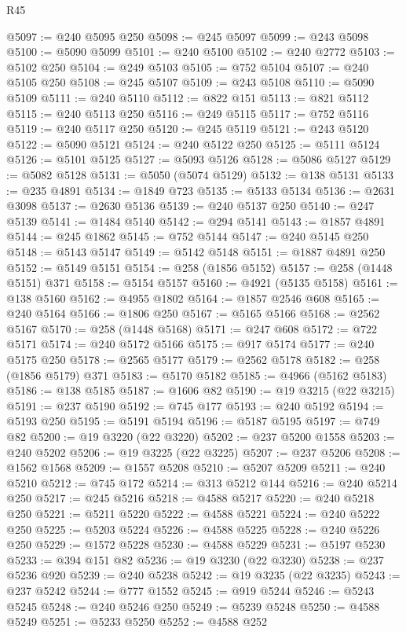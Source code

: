 \begin{lexlean}{R45}
\begin{coremodule}
{@5097 := @240 @5095 @250
@5098 := @245 @5097
@5099 := @243 @5098
@5100 := @5090 @5099
@5101 := @240 @5100
@5102 := @240 @2772
@5103 := @5102 @250
@5104 := @249 @5103
@5105 := @752 @5104
@5107 := @240 @5105 @250
@5108 := @245 @5107
@5109 := @243 @5108
@5110 := @5090 @5109
@5111 := @240 @5110
@5112 := @822 @151
@5113 := @821 @5112
@5115 := @240 @5113 @250
@5116 := @249 @5115
@5117 := @752 @5116
@5119 := @240 @5117 @250
@5120 := @245 @5119
@5121 := @243 @5120
@5122 := @5090 @5121
@5124 := @240 @5122 @250
@5125 := @5111 @5124
@5126 := @5101 @5125
@5127 := @5093 @5126
@5128 := @5086 @5127
@5129 := @5082 @5128
@5131 := @5050 (@5074 @5129)
@5132 := @138 @5131
@5133 := @235 @4891
@5134 := @1849 @723
@5135 := @5133 @5134
@5136 := @2631 @3098
@5137 := @2630 @5136
@5139 := @240 @5137 @250
@5140 := @247 @5139
@5141 := @1484 @5140
@5142 := @294 @5141
@5143 := @1857 @4891
@5144 := @245 @1862
@5145 := @752 @5144
@5147 := @240 @5145 @250
@5148 := @5143 @5147
@5149 := @5142 @5148
@5151 := @1887 @4891 @250
@5152 := @5149 @5151
@5154 := @258 (@1856 @5152)
@5157 := @258 (@1448 @5151) @371
@5158 := @5154 @5157
@5160 := @4921 (@5135 @5158)
@5161 := @138 @5160
@5162 := @4955 @1802
@5164 := @1857 @2546 @608
@5165 := @240 @5164
@5166 := @1806 @250
@5167 := @5165 @5166
@5168 := @2562 @5167
@5170 := @258 (@1448 @5168)
@5171 := @247 @608
@5172 := @722 @5171
@5174 := @240 @5172 @5166
@5175 := @917 @5174
@5177 := @240 @5175 @250
@5178 := @2565 @5177
@5179 := @2562 @5178
@5182 := @258 (@1856 @5179) @371
@5183 := @5170 @5182
@5185 := @4966 (@5162 @5183)
@5186 := @138 @5185
@5187 := @1606 @82
@5190 := @19 @3215 (@22 @3215)
@5191 := @237 @5190
@5192 := @745 @177
@5193 := @240 @5192
@5194 := @5193 @250
@5195 := @5191 @5194
@5196 := @5187 @5195
@5197 := @749 @82
@5200 := @19 @3220 (@22 @3220)
@5202 := @237 @5200 @1558
@5203 := @240 @5202
@5206 := @19 @3225 (@22 @3225)
@5207 := @237 @5206
@5208 := @1562 @1568
@5209 := @1557 @5208
@5210 := @5207 @5209
@5211 := @240 @5210
@5212 := @745 @172
@5214 := @313 @5212 @144
@5216 := @240 @5214 @250
@5217 := @245 @5216
@5218 := @4588 @5217
@5220 := @240 @5218 @250
@5221 := @5211 @5220
@5222 := @4588 @5221
@5224 := @240 @5222 @250
@5225 := @5203 @5224
@5226 := @4588 @5225
@5228 := @240 @5226 @250
@5229 := @1572 @5228
@5230 := @4588 @5229
@5231 := @5197 @5230
@5233 := @394 @151 @82
@5236 := @19 @3230 (@22 @3230)
@5238 := @237 @5236 @920
@5239 := @240 @5238
@5242 := @19 @3235 (@22 @3235)
@5243 := @237 @5242
@5244 := @777 @1552
@5245 := @919 @5244
@5246 := @5243 @5245
@5248 := @240 @5246 @250
@5249 := @5239 @5248
@5250 := @4588 @5249
@5251 := @5233 @5250
@5252 := @4588 @252
}
\end{coremodule}
\end{lexlean}
